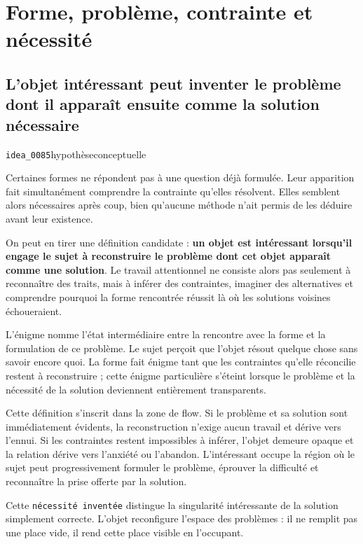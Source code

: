 \documentclass[10pt,a4paper]{article}
\begin{document}
\section{Forme, problème, contrainte et nécessité}

\subsection{L'objet intéressant peut inventer le problème dont il apparaît ensuite comme la solution nécessaire}
{\small\color{metadata} \texttt{idea\_0085}\quad\textbullet\quad hypothèse\quad\textbullet\quad conceptuelle\par}

Certaines formes ne répondent pas à une question déjà formulée. Leur apparition fait simultanément comprendre la contrainte qu'elles résolvent. Elles semblent alors nécessaires après coup, bien qu'aucune méthode n'ait permis de les déduire avant leur existence.

On peut en tirer une définition candidate : \textbf{un objet est intéressant lorsqu'il engage le sujet à reconstruire le problème dont cet objet apparaît comme une solution}. Le travail attentionnel ne consiste alors pas seulement à reconnaître des traits, mais à inférer des contraintes, imaginer des alternatives et comprendre pourquoi la forme rencontrée réussit là où les solutions voisines échoueraient.

L'énigme nomme l'état intermédiaire entre la rencontre avec la forme et la formulation de ce problème. Le sujet perçoit que l'objet résout quelque chose sans savoir encore quoi. La forme fait énigme tant que les contraintes qu'elle réconcilie restent à reconstruire ; cette énigme particulière s'éteint lorsque le problème et la nécessité de la solution deviennent entièrement transparents.

Cette définition s'inscrit dans la zone de flow. Si le problème et sa solution sont immédiatement évidents, la reconstruction n'exige aucun travail et dérive vers l'ennui. Si les contraintes restent impossibles à inférer, l'objet demeure opaque et la relation dérive vers l'anxiété ou l'abandon. L'intéressant occupe la région où le sujet peut progressivement formuler le problème, éprouver la difficulté et reconnaître la prise offerte par la solution.

Cette \texttt{nécessité inventée} distingue la singularité intéressante de la solution simplement correcte. L'objet reconfigure l'espace des problèmes : il ne remplit pas une place vide, il rend cette place visible en l'occupant.
\end{document}
